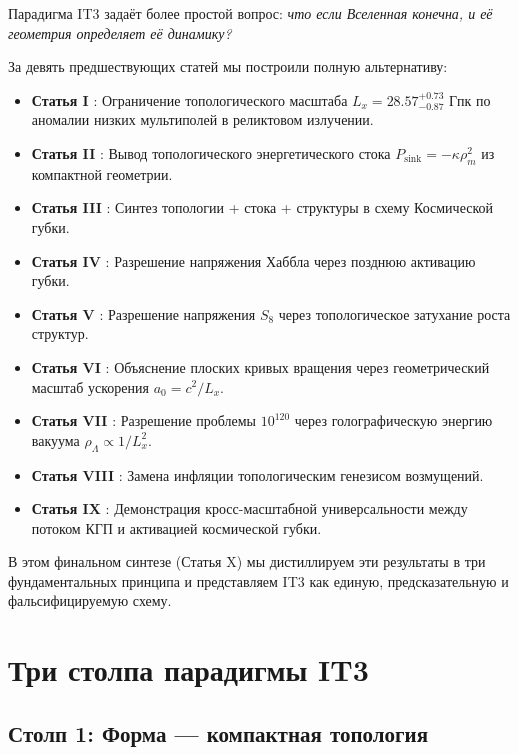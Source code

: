 \documentclass[12pt,a4paper]{article}
\begin{document}
Парадигма IT3 задаёт более простой вопрос: \textit{что если Вселенная конечна, и её геометрия определяет её динамику?}

За девять предшествующих статей мы построили полную альтернативу:
\begin{itemize}
    \item \textbf{Статья I} \citep{Logvinovich2026a}: Ограничение топологического масштаба $L_x = 28.57^{+0.73}_{-0.87}$ Гпк по аномалии низких мультиполей в реликтовом излучении.
    \item \textbf{Статья II} \citep{Logvinovich2026b}: Вывод топологического энергетического стока $P_{\mathrm{sink}} = -\kappa \rho_m^2$ из компактной геометрии.
    \item \textbf{Статья III} \citep{Logvinovich2026c}: Синтез топологии + стока + структуры в схему Космической губки.
    \item \textbf{Статья IV} \citep{Logvinovich2026d}: Разрешение напряжения Хаббла через позднюю активацию губки.
    \item \textbf{Статья V} \citep{Logvinovich2026e}: Разрешение напряжения $S_8$ через топологическое затухание роста структур.
    \item \textbf{Статья VI} \citep{Logvinovich2026f}: Объяснение плоских кривых вращения через геометрический масштаб ускорения $a_0 = c^2/L_x$.
    \item \textbf{Статья VII} \citep{Logvinovich2026g}: Разрешение проблемы $10^{120}$ через голографическую энергию вакуума $\rho_\Lambda \propto 1/L_x^2$.
    \item \textbf{Статья VIII} \citep{Logvinovich2026h}: Замена инфляции топологическим генезисом возмущений.
    \item \textbf{Статья IX} \citep{Logvinovich2026i}: Демонстрация кросс-масштабной универсальности между потоком КГП и активацией космической губки.
\end{itemize}

В этом финальном синтезе (Статья X) мы дистиллируем эти результаты в три фундаментальных принципа и представляем IT3 как единую, предсказательную и фальсифицируемую схему.

\section{Три столпа парадигмы IT3}

\subsection{Столп 1: Форма — компактная топология}
\end{document}
